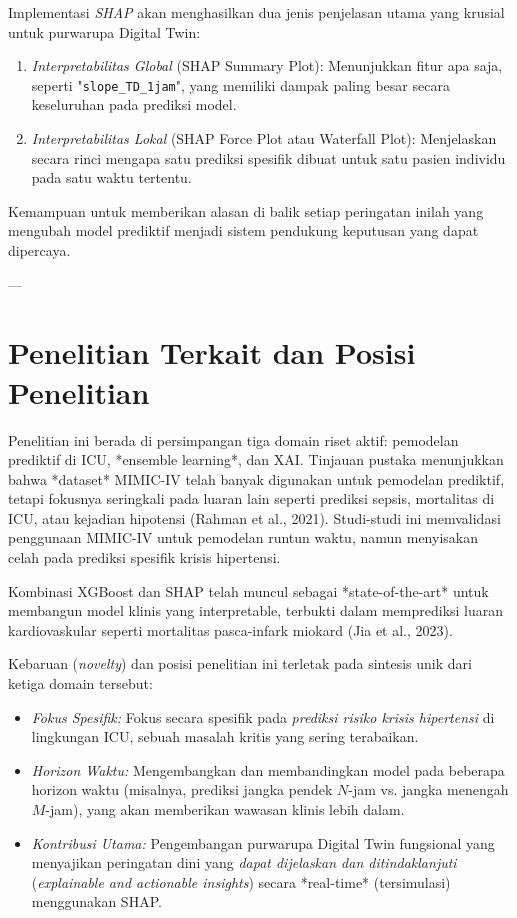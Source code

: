 Implementasi \textit{SHAP} akan menghasilkan dua jenis penjelasan utama yang krusial untuk purwarupa Digital Twin:
\begin{enumerate}
    \item \textit{Interpretabilitas Global} (SHAP Summary Plot): Menunjukkan fitur apa saja, seperti "\texttt{slope\_TD\_1jam}", yang memiliki dampak paling besar secara keseluruhan pada prediksi model.
    \item \textit{Interpretabilitas Lokal} (SHAP Force Plot atau Waterfall Plot): Menjelaskan secara rinci mengapa satu prediksi spesifik dibuat untuk satu pasien individu pada satu waktu tertentu.
\end{enumerate}
Kemampuan untuk memberikan alasan di balik setiap peringatan inilah yang mengubah model prediktif menjadi sistem pendukung keputusan yang dapat dipercaya.

--- %
\section{Penelitian Terkait dan Posisi Penelitian}
Penelitian ini berada di persimpangan tiga domain riset aktif: pemodelan prediktif di ICU, *ensemble learning*, dan XAI. Tinjauan pustaka menunjukkan bahwa *dataset* MIMIC-IV telah banyak digunakan untuk pemodelan prediktif, tetapi fokusnya seringkali pada luaran lain seperti prediksi sepsis, mortalitas di ICU, atau kejadian hipotensi (Rahman et al., 2021). Studi-studi ini memvalidasi penggunaan MIMIC-IV untuk pemodelan runtun waktu, namun menyisakan celah pada prediksi spesifik krisis hipertensi.

Kombinasi XGBoost dan SHAP telah muncul sebagai *state-of-the-art* untuk membangun model klinis yang interpretable, terbukti dalam memprediksi luaran kardiovaskular seperti mortalitas pasca-infark miokard (Jia et al., 2023).

Kebaruan (\textit{novelty}) dan posisi penelitian ini terletak pada sintesis unik dari ketiga domain tersebut:
\begin{itemize}
    \item \textit{Fokus Spesifik:} Fokus secara spesifik pada \textit{prediksi risiko krisis hipertensi} di lingkungan ICU, sebuah masalah kritis yang sering terabaikan.
    \item \textit{Horizon Waktu:} Mengembangkan dan membandingkan model pada beberapa horizon waktu (misalnya, prediksi jangka pendek $N$-jam vs. jangka menengah $M$-jam), yang akan memberikan wawasan klinis lebih dalam.
    \item \textit{Kontribusi Utama:} Pengembangan purwarupa Digital Twin fungsional yang menyajikan peringatan dini yang \textit{dapat dijelaskan dan ditindaklanjuti} (\textit{explainable and actionable insights}) secara *real-time* (tersimulasi) menggunakan SHAP.
\end{itemize}